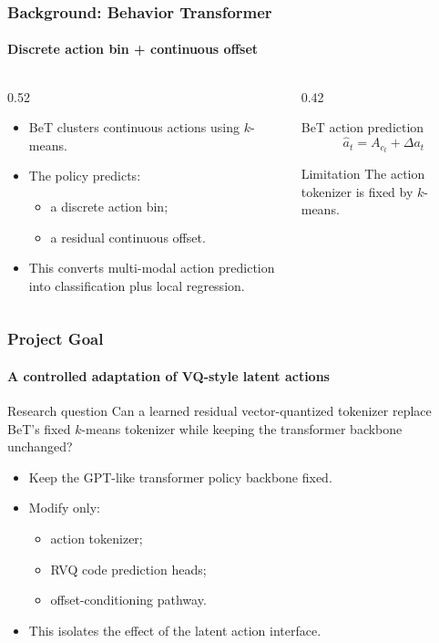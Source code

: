 \documentclass[aspectratio=169]{ctexbeamer}
\begin{document}
\begin{frame}
  \frametitle{Background: Behavior Transformer}
  \framesubtitle{Discrete action bin + continuous offset}
  \begin{columns}[T]
    \begin{column}{0.52\textwidth}
      \begin{itemize}
        \item BeT clusters continuous actions using $k$-means.
        \item The policy predicts:
        \begin{itemize}
          \item a discrete action bin;
          \item a residual continuous offset.
        \end{itemize}
        \item This converts multi-modal action prediction into classification plus local regression.
      \end{itemize}
    \end{column}
    \begin{column}{0.42\textwidth}
      \begin{block}{BeT action prediction}
      \begin{equation*}
        \hat{a}_t = A_{c_t} + \Delta a_t
      \end{equation*}
      \end{block}
      \begin{alertblock}{Limitation}
        The action tokenizer is fixed by $k$-means.
      \end{alertblock}
    \end{column}
  \end{columns}
\end{frame}

\begin{frame}
  \frametitle{Project Goal}
  \framesubtitle{A controlled adaptation of VQ-style latent actions}
  \begin{block}{Research question}
    Can a learned residual vector-quantized tokenizer replace BeT's fixed $k$-means tokenizer while keeping the transformer backbone unchanged?
  \end{block}
  \vspace{0.6em}
  \begin{itemize}
    \item Keep the GPT-like transformer policy backbone fixed.
    \item Modify only:
    \begin{itemize}
      \item action tokenizer;
      \item RVQ code prediction heads;
      \item offset-conditioning pathway.
    \end{itemize}
    \item This isolates the effect of the latent action interface.
  \end{itemize}
\end{frame}
\end{document}
